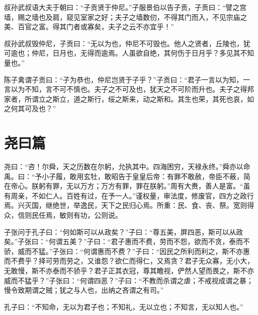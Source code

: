 \documentclass[12pt,a4paper]{ctexbook}
\begin{document}
叔孙武叔语大夫于朝曰：“子贡贤于仲尼。”子服景伯以告子贡，子贡曰：“譬之宫墙，赐之墙也及肩，窥见室家之好；夫子之墙数仞，不得其门而入，不见宗庙之美、百官之富。得其门者或寡矣，夫子之云不亦宜乎！”\par
叔孙武叔毁仲尼，子贡曰：“无以为也，仲尼不可毁也。他人之贤者，丘陵也，犹可逾也；仲尼，日月也，无得而逾焉。人虽欲自绝，其何伤于日月乎？多见其不知量也。”\par
陈子禽谓子贡曰：“子为恭也，仲尼岂贤于子乎？”子贡曰：“君子一言以为知，一言以为不知，言不可不慎也。夫子之不可及也，犹天之不可阶而升也。夫子之得邦家者，所谓立之斯立，道之斯行，绥之斯来，动之斯和。其生也荣，其死也哀，如之何其可及也？”\par

\section{尧曰篇}
尧曰：“咨！尔舜，天之历数在尔躬，允执其中。四海困穷，天禄永终。”舜亦以命禹。曰：“予小子履，敢用玄牡，敢昭告于皇皇后帝：有罪不敢赦，帝臣不蔽，简在帝心。朕躬有罪，无以万方；万方有罪，罪在朕躬。”周有大赉，善人是富。“虽有周亲，不如仁人。百姓有过，在予一人。”谨权量，审法度，修废官，四方之政行焉。兴灭国，继绝世，举逸民，天下之民归心焉。所重：民、食、丧、祭。宽则得众，信则民任焉，敏则有功，公则说。\par
子张问于孔子曰：“何如斯可以从政矣？”子曰：“尊五美，屏四恶，斯可以从政矣。”子张曰：“何谓五美？”子曰：“君子惠而不费，劳而不怨，欲而不贪，泰而不骄，威而不猛。”子张曰：“何谓惠而不费？”子曰：“因民之所利而利之，斯不亦惠而不费乎？择可劳而劳之，又谁怨？欲仁而得仁，又焉贪？君子无众寡，无小大，无敢慢，斯不亦泰而不骄乎？君子正其衣冠，尊其瞻视，俨然人望而畏之，斯不亦威而不猛乎？”子张曰：“何谓四恶？”子曰：“不教而杀谓之虐；不戒视成谓之暴；慢令致期谓之贼；犹之与人也，出纳之吝谓之有司。”\par
孔子曰：“不知命，无以为君子也；不知礼，无以立也；不知言，无以知人也。”\par
\end{document}

